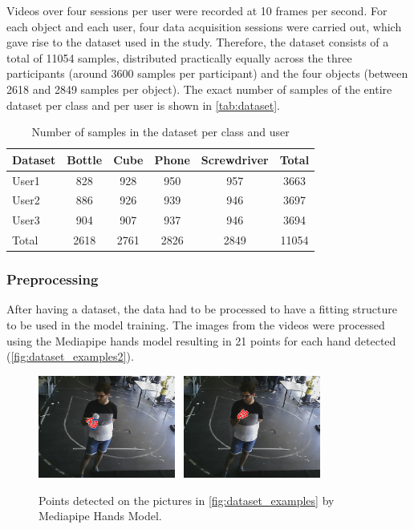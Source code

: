 Videos over four sessions per user were recorded at 10 frames per second. For each object and each user, four data acquisition sessions were carried out, which gave rise to the dataset used in the study. Therefore, the dataset consists of a total of \num{11054} samples, distributed practically equally across the three participants (around \num{3600} samples per participant) and the four objects (between \num{2618} and \num{2849} samples per object). The exact number of samples of the entire dataset per class and per user is shown in \autoref{tab:dataset}.

\begin{table}[ht] 
\centering
\caption{Number of samples in the dataset per class and user}
\label{tab:dataset}
\begin{tabular}{lccccc}
\toprule
Dataset & Bottle & Cube & Phone & Screwdriver & Total \\
\midrule
User1 & \num{828} & \num{928} & \num{950} & \num{957} & \num{3663}\\
User2 & \num{886} & \num{926} & \num{939} & \num{946} & \num{3697}\\
User3 & \num{904} & \num{907} & \num{937} & \num{946} & \num{3694}\\
\midrule
Total & \num{2618} & \num{2761} & \num{2826} & \num{2849} & \num{11054}\\
\bottomrule
\end{tabular}
\end{table}

\subsubsection{Preprocessing}

After having a dataset, the data had to be processed to have a fitting structure to be used in the model training. The images from the videos were processed using the Mediapipe hands model resulting in 21 points for each hand detected (\autoref{fig:dataset_examples2}).

\begin{figure}[ht]
    \centerline{\includegraphics[width=0.4\textwidth]{figs/dataset_preprocessing2_1.png} \ \includegraphics[width=0.4\textwidth]{figs/dataset_preprocessing2_2.png}}
    \caption{Points detected on the pictures in \autoref{fig:dataset_examples} by Mediapipe Hands Model.}
    \label{fig:dataset_examples2}
\end{figure}

